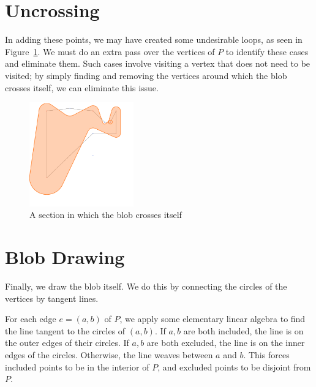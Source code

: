 \documentclass[paper=a4, fontsize=11pt]{scrartcl} %
\numberwithin{equation}{section} %
\numberwithin{figure}{section} %
\numberwithin{table}{section} %
\begin{document}
\section{Uncrossing}

In adding these points, we may have created some undesirable loops, as seen in
Figure~\ref{fig:loop}. We must do an extra pass over the vertices of $P$ to
identify these cases and eliminate them. Such cases involve visiting a vertex
that does not need to be visited; by simply finding and removing the vertices
around which the blob crosses itself, we can eliminate this issue.

\begin{figure}[h]
\includegraphics[width=0.4\textwidth]{loop}
\centering
\caption{A section in which the blob crosses itself}
\label{fig:loop}
\end{figure}

\section{Blob Drawing}
Finally, we draw the blob itself. We do this by connecting the circles of the
vertices by tangent lines.

For each edge $e=(a,b)$ of $P$, we apply some elementary linear algebra to find
the line tangent to the circles of $(a,b)$. If $a,b$ are both included, the line
is on the outer edges of their circles. If $a,b$ are both excluded, the line is
on the inner edges of the circles. Otherwise, the line weaves between $a$ and
$b$. This forces included points to be in the interior of $P$, and excluded
points to be disjoint from $P$.
\end{document}
